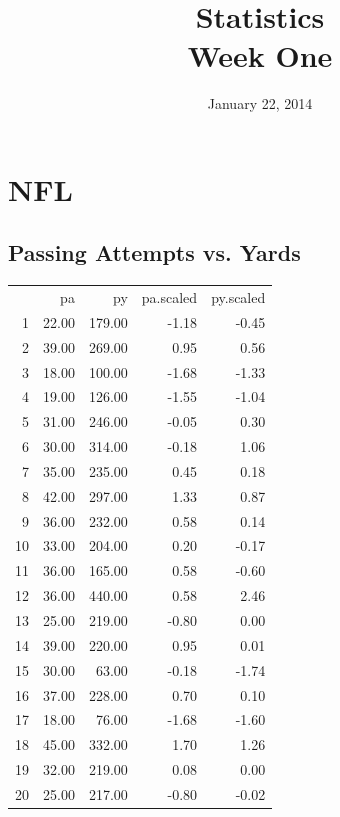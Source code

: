 \documentclass{exam}
\author{}
\date{January 22, 2014}
\title{Statistics \\ Week One}
\begin{document}
\maketitle
\tableofcontents

  \section{NFL}

  \subsection{Passing Attempts vs. Yards}

  \begin{table}[H]
    \centering
    \begin{tabular}{rrrrr}
      \toprule
      \midrule
         & pa    & py     & pa.scaled & py.scaled \\
      1  & 22.00 & 179.00 & -1.18     & -0.45 \\
      2  & 39.00 & 269.00 & 0.95      & 0.56 \\
      3  & 18.00 & 100.00 & -1.68     & -1.33 \\
      4  & 19.00 & 126.00 & -1.55     & -1.04 \\
      5  & 31.00 & 246.00 & -0.05     & 0.30 \\
      6  & 30.00 & 314.00 & -0.18     & 1.06 \\
      7  & 35.00 & 235.00 & 0.45      & 0.18 \\
      8  & 42.00 & 297.00 & 1.33      & 0.87 \\
      9  & 36.00 & 232.00 & 0.58      & 0.14 \\
      10 & 33.00 & 204.00 & 0.20      & -0.17 \\
      11 & 36.00 & 165.00 & 0.58      & -0.60 \\
      12 & 36.00 & 440.00 & 0.58      & 2.46 \\
      13 & 25.00 & 219.00 & -0.80     & 0.00 \\
      14 & 39.00 & 220.00 & 0.95      & 0.01 \\
      15 & 30.00 & 63.00  & -0.18     & -1.74 \\
      16 & 37.00 & 228.00 & 0.70      & 0.10 \\
      17 & 18.00 & 76.00  & -1.68     & -1.60 \\
      18 & 45.00 & 332.00 & 1.70      & 1.26 \\
      19 & 32.00 & 219.00 & 0.08      & 0.00 \\
      20 & 25.00 & 217.00 & -0.80     & -0.02 \\
      \bottomrule
    \end{tabular}
  \end{table}
\end{document}
